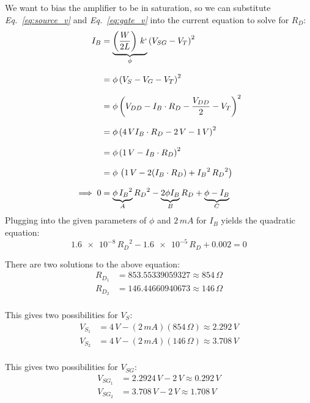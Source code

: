 \documentclass[12pt, fleqn]{article}
\begin{document}
\begin{enumerate}[label=(\alph*)]
    We want to bias the amplifier to be in saturation, so we can substitute \textit{Eq.~\ref{eq:source_v}} and \textit{Eq.~\ref{eq:gate_v}} into the current equation to solve for $R_D$:
    \begin{align*}
        I_B &= \underbrace{\left(\frac{W}{2L}\right)\,k`}_\phi {\left(V_{SG} - V_T\right)}^2\\[0.25cm]
        &= \phi\,{\left(V_S - V_G - V_T\right)}^2\\[0.25cm]
        &= \phi\,{\left(V_{DD} - I_B \cdot R_D - \frac{V_{DD}}{2} - V_T\right)}^2\\[0.25cm]
        &= \phi\,{\left(4\,V I_B \cdot R_D - 2\,V - 1\,V\right)}^2\\[0.25cm]
        &= \phi\,{\left(1\,V - I_B \cdot R_D\right)}^2\\[0.25cm]
        &= \phi\,\left(1\,V - 2(I_B \cdot R_D) + {I_B}^2\,{R_D}^2\right)\\[0.25cm]
        \implies 0 &= \underbrace{\phi\,{I_B}^2}_A {R_D}^2 - \underbrace{2\phi I_B}_B R_D + \underbrace{\phi - I_B}_C
    \end{align*}
    \newpage\noindent
    Plugging into the given parameters of $\phi$ and $2\,mA$ for $I_B$ yields the quadratic equation:
    \begin{equation}
        \num{1.6e-8}\,{R_D}^2 - \num{1.6e-5}\,R_D + 0.002 = 0
    \end{equation}
    
    There are two solutions to the above equation:
    \begin{align*}
        R_{D_1} &= 853.55339059327 \approx 854\,\Omega\\[0.25cm]
        R_{D_2} &= 146.44660940673 \approx 146\,\Omega\\[0.25cm]
    \end{align*}
    
    This gives two possibilities for $V_S$:
    \begin{align*}
        V_{S_1} &= 4\,V - (2\,mA)(854\,\Omega) \approx 2.292\,V\\[0.25cm]
        V_{S_2} &= 4\,V - (2\,mA)(146\,\Omega) \approx 3.708\,V\\[0.25cm]
    \end{align*}

    This gives two possibilities for $V_{SG}$:
    \begin{align*}
        V_{{SG}_1} &= 2.2924\,V - 2\,V \approx 0.292\,V\\[0.25cm]
        V_{{SG}_2} &= 3.708\,V - 2\,V \approx 1.708\,V\\[0.25cm]
    \end{align*}
    

\end{enumerate}
\end{document}
